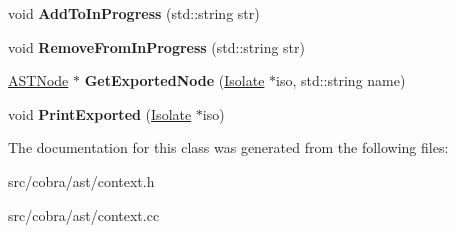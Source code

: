 \begin{DoxyCompactItemize}
\item 
\hypertarget{class_cobra_1_1internal_1_1_context_a28c2f40e6d64392b412184212005645c}{void {\bfseries Add\+To\+In\+Progress} (std\+::string str)}\label{class_cobra_1_1internal_1_1_context_a28c2f40e6d64392b412184212005645c}

\item 
\hypertarget{class_cobra_1_1internal_1_1_context_afe6bf704c553475cbdc32d89e489a852}{void {\bfseries Remove\+From\+In\+Progress} (std\+::string str)}\label{class_cobra_1_1internal_1_1_context_afe6bf704c553475cbdc32d89e489a852}

\item 
\hypertarget{class_cobra_1_1internal_1_1_context_ac5fbe95bc5050c2d65e1613b8ee394ee}{\hyperlink{class_cobra_1_1internal_1_1_a_s_t_node}{A\+S\+T\+Node} $\ast$ {\bfseries Get\+Exported\+Node} (\hyperlink{class_cobra_1_1internal_1_1_isolate}{Isolate} $\ast$iso, std\+::string name)}\label{class_cobra_1_1internal_1_1_context_ac5fbe95bc5050c2d65e1613b8ee394ee}

\item 
\hypertarget{class_cobra_1_1internal_1_1_context_a4c9a29cfb706daa42c584f21d1c2f881}{void {\bfseries Print\+Exported} (\hyperlink{class_cobra_1_1internal_1_1_isolate}{Isolate} $\ast$iso)}\label{class_cobra_1_1internal_1_1_context_a4c9a29cfb706daa42c584f21d1c2f881}

\end{DoxyCompactItemize}


The documentation for this class was generated from the following files\+:\begin{DoxyCompactItemize}
\item 
src/cobra/ast/context.\+h\item 
src/cobra/ast/context.\+cc\end{DoxyCompactItemize}
